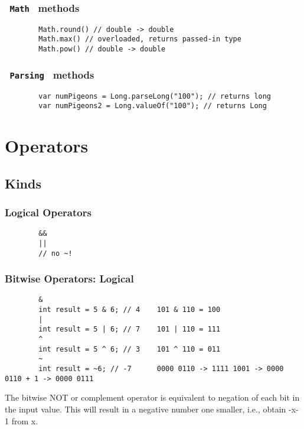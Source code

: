 \documentclass{scrartcl}
\begin{document}
\subsubsection{\lstinline$ Math $ methods}
    \begin{lstlisting}
        Math.round() // double -> double
        Math.max() // overloaded, returns passed-in type
        Math.pow() // double -> double
    \end{lstlisting}

\subsubsection{\lstinline$ Parsing $ methods}
    \begin{lstlisting}
        var numPigeons = Long.parseLong("100"); // returns long
        var numPigeons2 = Long.valueOf("100"); // returns Long
    \end{lstlisting}


\section{Operators}
\subsection{Kinds}
\subsubsection{Logical Operators}
    \begin{lstlisting}
        &&
        ||
        // no ~!
    \end{lstlisting}

\subsubsection{Bitwise Operators: Logical}
    \begin{lstlisting}
        &
        int result = 5 & 6; // 4    101 & 110 = 100
        |
        int result = 5 | 6; // 7    101 | 110 = 111
        ^
        int result = 5 ^ 6; // 3    101 ^ 110 = 011
        ~
        int result = ~6; // -7      0000 0110 -> 1111 1001 -> 0000 0110 + 1 -> 0000 0111
    \end{lstlisting}

    The bitwise NOT or complement operator is equivalent to negation of each bit in the input value. This will result in a negative number one smaller, i.e., obtain -x-1 from x.
\end{document}
